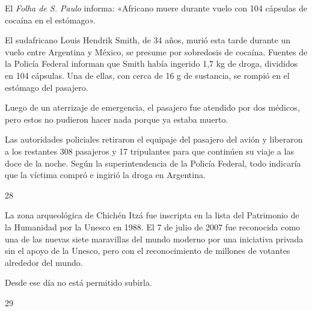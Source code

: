 \documentclass[12pt,twoside,openright,a5paper]{book}
\begin{document}
\nopagebreak

\vspace{0.5cm}

\nopagebreak

El \emph{Folha de S. Paulo} informa: «Africano muere
durante vuelo con 104 cápsulas de cocaína en el estómago».

El sudafricano
Louis Hendrik Smith, de 34 años, murió esta tarde durante un vuelo entre
Argentina y México, se presume por sobredosis de cocaína. Fuentes de
la Policía Federal informan que Smith había ingerido 1,7 kg de droga,
divididos en 104 cápsulas. Una de ellas, con cerca de 16 g de sustancia,
se rompió en el estómago del pasajero.

Luego de un aterrizaje de emergencia, el pasajero fue atendido por dos
médicos, pero estos no pudieron hacer nada porque ya estaba muerto.

Las autoridades policiales retiraron el equipaje del pasajero del avión y
liberaron a los restantes 308 pasajeros y 17 tripulantes para que continúen
su viaje a las doce de la noche.  Según la superintendencia de la Policía
Federal, todo indicaría que la víctima compró e ingirió la droga en
Argentina.

\vspace{0.5cm}

\hrulefill \hspace{0.1cm}\decofourleft\hspace{0.2cm} 28 \hspace{0.2cm}\decofourright \hspace{0.1cm}\hrulefill

\nopagebreak

\vspace{0.5cm}

\nopagebreak

La zona arqueológica de Chichén Itzá fue inscripta en la lista del
Patrimonio de la Humanidad por la Unesco en 1988. El 7 de julio de 2007 fue
reconocida como una de las nuevas siete maravillas del mundo moderno por
una iniciativa privada sin el apoyo de la Unesco, pero con el reconocimiento
de millones de votantes alrededor del mundo.

Desde ese día no está permitido subirla.

\vspace{0.5cm}
\afterpage{}
\hrulefill \hspace{0.1cm}\decofourleft\hspace{0.2cm} 29 \hspace{0.2cm}\decofourright \hspace{0.1cm}\hrulefill
\end{document}
